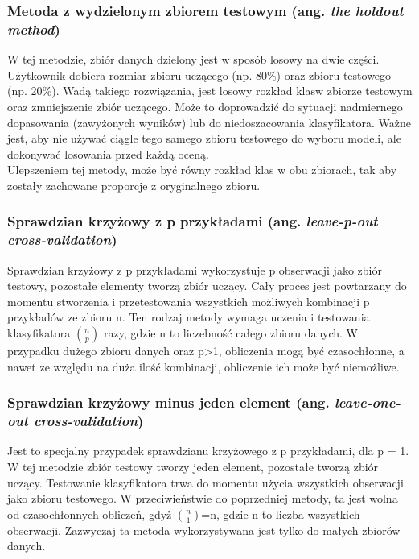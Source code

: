 \subsubsection{Metoda z wydzielonym zbiorem testowym (ang. \textit{the holdout method})}
W tej metodzie, zbiór danych dzielony jest w sposób losowy na dwie części. Użytkownik dobiera rozmiar zbioru uczącego (np. 80\%) oraz zbioru testowego (np. 20\%). Wadą takiego rozwiązania, jest losowy rozkład klasw zbiorze testowym oraz zmniejszenie zbiór uczącego. Może to doprowadzić do sytuacji nadmiernego dopasowania (zawyżonych wyników) lub do niedoszacowania klasyfikatora. Ważne jest, aby nie używać ciągle tego samego zbioru testowego do wyboru modeli, ale dokonywać losowania przed każdą oceną.\\
Ulepszeniem tej metody, może być równy rozkład klas w obu zbiorach, tak aby zostały zachowane proporcje z oryginalnego zbioru.

\subsubsection{Sprawdzian krzyżowy z p przykładami (ang. \textit{leave-p-out cross-validation})}
Sprawdzian krzyżowy z p przykładami wykorzystuje p obserwacji jako zbiór testowy, pozostałe elementy tworzą zbiór uczący. Cały proces jest powtarzany do momentu stworzenia i przetestowania wszystkich możliwych kombinacji p przykładów ze zbioru n. Ten rodzaj metody wymaga uczenia i testowania klasyfikatora $\binom{n}{p}$ razy, gdzie n to liczebność całego zbioru danych. W przypadku dużego zbioru danych oraz p>1, obliczenia mogą być czasochłonne, a nawet ze względu na duża ilość kombinacji, obliczenie ich może być niemożliwe.

\subsubsection{Sprawdzian krzyżowy minus jeden element (ang. \textit{leave-one-out cross-validation})}
Jest to specjalny przypadek sprawdzianu krzyżowego z p przykładami, dla p = 1. W tej metodzie zbiór testowy tworzy jeden element, pozostałe tworzą zbiór uczący. Testowanie klasyfikatora trwa do momentu użycia wszystkich obserwacji jako zbioru testowego. W przeciwieństwie do poprzedniej metody, ta jest wolna od czasochłonnych obliczeń, gdyż $\binom{n}{1}$=n, gdzie n to liczba wszystkich obserwacji. Zazwyczaj ta metoda wykorzystywana jest tylko do małych zbiorów danych.

